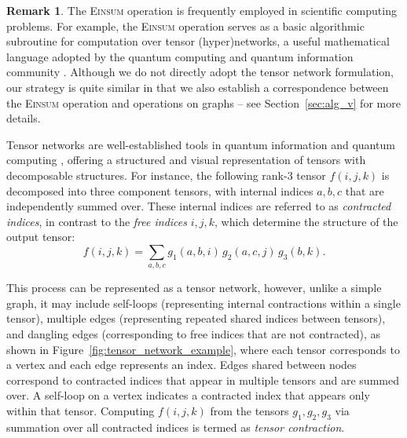 \documentclass[12pt]{article}
\theoremstyle{plain}
\theoremstyle{definition}
\newtheorem{remark}{Remark}
\def\Einsum{\textsc{Einsum}}
\begin{document}
\begin{bibunit}[agsm]
\begin{remark}
\label{rem:tensor networks}
The \Einsum{} operation is frequently employed in scientific computing problems. For example, the \Einsum{} operation serves as a basic algorithmic subroutine for computation over tensor (hyper)networks, a useful mathematical language adopted by the quantum computing and quantum information community \citep{markov2008simulating}. %
Although we do not directly adopt the tensor network formulation, our strategy is quite similar in that we also establish a correspondence between the \Einsum{} operation and operations on graphs -- see Section~\ref{sec:alg_v} for more details. 
\end{remark}


\iffalse

Tensor networks are well-established tools in quantum information and quantum computing \citep{stoudenmire2018learning}, offering a structured and visual representation of tensors with decomposable structures. For instance, the following rank-3 tensor $f (i, j, k)$ is decomposed into three component tensors, with internal indices $ a, b, c $ that are independently summed over. These internal indices are referred to as \emph{contracted indices}, in contrast to the \emph{free indices} $ i, j, k $, which determine the structure of the output tensor:
\begin{equation*}
    f(i, j, k) = \sum_{a,b,c} g_1(a, b, i)\, g_2(a, c, j)\, g_3(b, k).
\end{equation*}

This process can be represented as a tensor network, however, unlike a simple graph, it may include self-loops (representing internal contractions within a single tensor), multiple edges (representing repeated shared indices between tensors), and dangling edges (corresponding to free indices that are not contracted), as shown in Figure~\ref{fig:tensor_network_example}, where each tensor corresponds to a vertex and each edge represents an index. Edges shared between nodes correspond to contracted indices that appear in multiple tensors and are summed over. A self-loop on a vertex indicates a contracted index that appears only within that tensor. Computing $ f(i, j, k) $ from the tensors $ g_1, g_2, g_3 $ via summation over all contracted indices is termed as \emph{tensor contraction}.


\end{bibunit}
\end{document}
